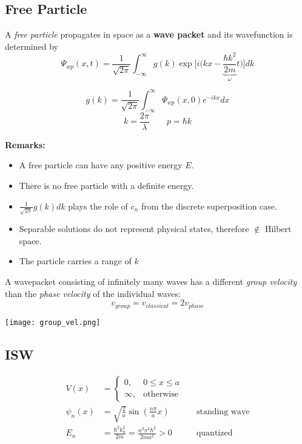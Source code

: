 \subsection{Free Particle}
A \textit{free particle} propagates in space as a \textbf{wave packet} and its wavefunction is determined by
\noindent\begin{equation*}
    \Psi_{wp}(x,t)=\frac{1}{\sqrt{2\pi}}\int_{-\infty}^{\infty}g(k)\exp\Biggl[i\Biggl(kx- \underbrace{\frac{\hbar k^{2}}{2m}}_{\omega}t\Biggr)\Biggr]dk
\end{equation*}

\noindent\begin{equation*}
    g(k)=\frac{1}{\sqrt{2\pi}}\int_{-\infty}^{\infty}\Psi_{wp}(x,0)e^{-ikx}dx
\end{equation*}
\begin{equation*}
    k  = \frac{2\pi}{\lambda}\qquad p  = \hbar k
\end{equation*}

\textbf{Remarks:}

\begin{itemize}
    \item A free particle can have any positive energy $E$.
    \item There is no free particle with a definite energy.
    \item $\frac{1}{\sqrt{2\pi}}g(k)dk$ plays the role of $c_n$ from the discrete superposition case.
    \item Separable solutions do not represent physical states, therefore $\notin$ Hilbert space.
    \item The particle carries a range of $k$
\end{itemize}


A wavepacket consisting of infinitely many waves has a different \textit{group velocity} than the \textit{phase velocity} of the individual waves:
\noindent\begin{equation*}
    v_{group} = v_{classical} = 2v_{phase}
\end{equation*}

\begin{center}
    \texttt{[image: group\_vel.png]}
\end{center}

\subsection{ISW}
\noindent\begin{align*}
    V(x)        & =\begin{cases}0,&0\le x\le a\\\infty,&\text{otherwise}\end{cases}                                  \\
    \psi_{n}(x) & =\sqrt{\frac{2}{a}}\sin\left(\frac{n\pi}{a}x\right)                      &  & \text{standing wave} \\
    E_{n}       & =\frac{\hbar^{2}k_{n}^{2}}{2m}=\frac{n^{2}\pi^{2}\hbar^{2}}{2ma^{2}} > 0 &  & \text{quantized}
\end{align*}

